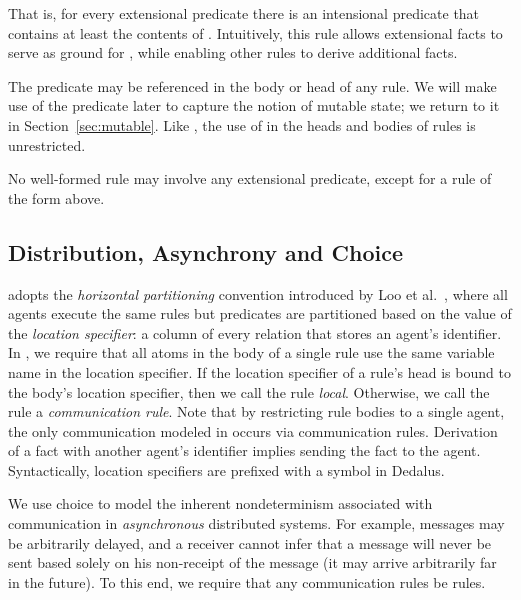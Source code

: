 \noindent{}That is, for every extensional predicate  there is an intensional
predicate  that contains at least the contents of .
Intuitively, this rule allows extensional facts to serve as ground for
, while enabling other rules to derive additional  facts.

The predicate  may be referenced in the body or head of any \lang rule.  
We will make use of the predicate  later to capture the notion of mutable state; we return to it in Section~\ref{sec:mutable}. 
Like , the use of  in the heads and bodies of rules is unrestricted.

\vspace{1.2em}
No well-formed \lang rule may involve any extensional predicate, except for a rule of the form above.


\subsection{Distribution, Asynchrony and Choice}

\lang adopts the {\em horizontal partitioning} convention introduced by Loo et
al.~\cite{Loo:2005}, where all agents execute the same rules but predicates are
partitioned based on the value of the {\em location specifier}: a column of
every relation that stores an agent's identifier. In \lang, we require that all
atoms in the body of a single rule use the same variable name in the location
specifier. If the location specifier of a rule's head is bound to the body's
location specifier, then we call the rule {\em local}.  Otherwise, we call the
rule a {\em communication rule}.  Note that by restricting rule bodies to a
single agent, the only communication modeled in \lang occurs via communication
rules.  Derivation of a fact with another agent's identifier implies sending
the fact to the agent.  Syntactically, location specifiers are prefixed with a
\dedalus{\#} symbol in Dedalus.

We use choice to model the inherent nondeterminism associated with
communication in {\em asynchronous} distributed systems.  For example, messages
may be arbitrarily delayed, and a receiver cannot infer that a message will
never be sent based solely on his non-receipt of the message (it may arrive
arbitrarily far in the future).
To this end, we require that any communication rules be  rules.

